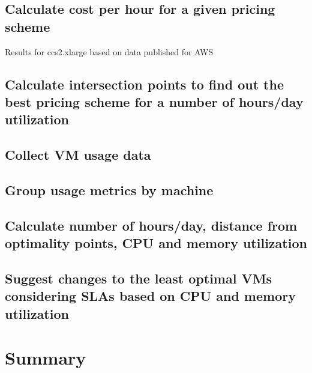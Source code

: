 \documentclass[]{final_report}
\begin{document}
\subsection{Calculate cost per hour for a given pricing scheme}
Results for ccs2.xlarge based on data published for AWS~\cite{AWS:2014} \par
{}
\subsection{Calculate intersection points to find out the best pricing scheme for a number of hours/day utilization}
\subsection{Collect VM usage data}
\subsection{Group usage metrics by machine}
\subsection{Calculate number of hours/day, distance from optimality points, CPU and memory utilization}
\subsection{Suggest changes to the least optimal VMs considering SLAs based on CPU and memory utilization}

\section{Summary}




\end{document}
